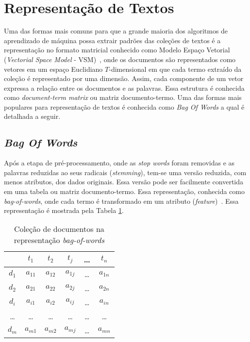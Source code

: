 
\section{Representação de Textos} \label{section:RepTextos}


Uma das formas mais comuns para que a grande maioria dos algoritmos de aprendizado de máquina possa extrair padrões das coleções de textos é a representação no formato matricial conhecido como Modelo Espaço Vetorial (\textit{Vectorial Space Model} - VSM)~\cite{Rezende2003}, onde os documentos são representados como vetores em um espaço Euclidiano $T$-dimensional em que cada termo extraído da coleção é representado por uma dimensão. Assim, cada componente de um vetor expressa a relação entre os documentos e as palavras. Essa estrutura é conhecida como \textit{document-term matrix} ou matriz documento-termo. Uma das formas mais populares para representação de textos é conhecida como \textit{Bag Of Words} a qual é detalhada a seguir.
	

\subsection{\textit{Bag Of Words}} \label{subsubsec:BOW}
Após a etapa de pré-processamento, onde as \textit{stop words} foram removidas e as palavras reduzidas ao seus radicais (\textit{stemming}), tem-se uma versão reduzida, com menos atributos, dos dados originais. Essa versão pode ser facilmente convertida em uma tabela ou matriz documento-termo. Essa representação, conhecida como \textit{bag-of-words}, onde cada termo é transformado em um atributo (\textit{feature})~\cite{Rezende2003}. Essa representação é mostrada pela Tabela \ref{table:bagofwords}.
		

\begin{table}[!h]
	\centering

	\begin{tabular}{|c|c|c|c|c|c|}

	\hline
	    & $t_1$      & $t_2$     & $t_j$    & \dots & $t_n$      \\ \hline
	$d_1$ & $a_{11}$ & $a_{12}$  & $a_{1j}$ & \dots & $a_{1n}$   \\ \hline 
	$d_2$ & $a_{21}$ & $a_{22}$  & $a_{2j}$ & \dots & $a_{2n}$   \\ \hline 
	$d_i$ & $a_{i1}$ & $a_{i2}$  & $a_{ij}$ & \dots & $a_{in}$   \\ \hline 
	\dots & \dots    & \dots     & \dots    & \dots & \dots      \\ \hline 
	$d_m$ & $a_{m1}$ & $a_{m2}$  & $a_{mj}$ & \dots & $a_{mn}$   \\ \hline 

	\end{tabular}

	\caption{Coleção de documentos na representação \textit{bag-of-words}}
	\label{table:bagofwords}\\ 
\end{table}



